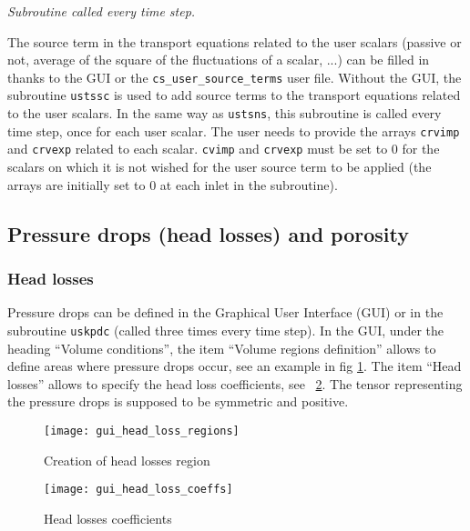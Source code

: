 {{{\noindent
\textit{Subroutine called every time step.}

The source term in the transport equations related to the user scalars
(passive or not, average of the square of the fluctuations of a scalar, ...)
can be filled in thanks to the GUI or the \texttt{cs\_user\_source\_terms} user file.
Without the GUI, the subroutine \texttt{ustssc} is used to add source terms to the
transport equations related to the user scalars. In the same way as
\texttt{ustsns}, this subroutine is called every time step, once for
each user scalar. The user needs to provide the arrays \texttt{crvimp}
and \texttt{crvexp} related to each scalar. \texttt{cvimp} and \texttt{crvexp}
must be set to 0 for the scalars on which it is not wished for the user source
term to be applied (the arrays are initially set to 0 at each inlet in the subroutine).

\subsection{Pressure drops (head losses) and porosity}
\label{sec:prg_headlosses}

\subsubsection{Head losses}

Pressure drops can be defined in the Graphical User Interface (GUI) or in the subroutine \texttt{uskpdc} (called three times every time step). In the GUI, under the heading ``Volume conditions'', the item ``Volume regions definition'' allows to define areas where pressure drops occur, see an example in fig \ref{fig:hl1}. The item ``Head losses'' allows to specify the head loss coefficients, see \figurename~\ref{fig:hl2}. The tensor representing the pressure drops is supposed to be symmetric
and positive.

\begin{figure}[!ht]
\begin{center}
\texttt{[image: gui\_head\_loss\_regions]}
\caption{Creation of head losses region}
\label{fig:hl1}
\end{center}
\end{figure}
%
\begin{figure}[!ht]
\begin{center}
\texttt{[image: gui\_head\_loss\_coeffs]}
\caption{Head losses coefficients}
\label{fig:hl2}
\end{center}
\end{figure}

}}}
